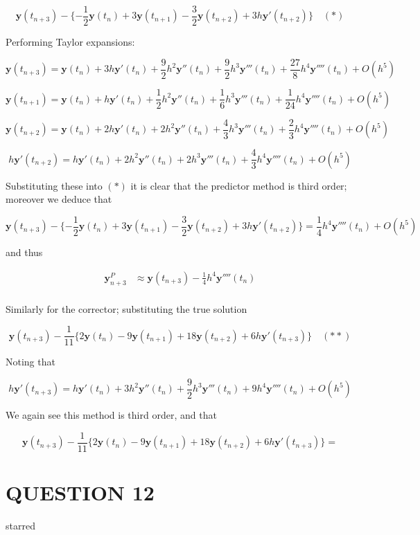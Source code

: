 \documentclass[a4paper]{article}
\begin{document}
\[ \mathbf{y}(t_{n+3}) - \{  - \frac{1}{2} \mathbf{y}(t_{n}) + 3 \mathbf{y}(t_{n+1})  - \frac{3}{2} \mathbf{y}(t_{n+2}) + 3h\mathbf{y}'(t_{n+2})  \} \quad (*) \]

Performing Taylor expansions:

\[ \mathbf{y}(t_{n+3}) = \mathbf{y}(t_{n}) + 3h \mathbf{y}'(t_{n}) + \frac{9}{2} h^{2} \mathbf{y}''(t_{n}) + \frac{9}{2} h^{3}  \mathbf{y}'''(t_{n}) + \frac{27}{8} h^{4} \mathbf{y}''''(t_{n})+ O(h^{5}) \]


\[ \mathbf{y}(t_{n+1}) = \mathbf{y}(t_{n}) + h \mathbf{y}'(t_{n}) + \frac{1}{2} h^{2} \mathbf{y}''(t_{n}) + \frac{1}{6} h^{3}  \mathbf{y}'''(t_{n}) + \frac{1}{24} h^{4} \mathbf{y}''''(t_{n})+ O(h^{5}) \]



\[ \mathbf{y}(t_{n+2}) = \mathbf{y}(t_{n}) + 2h \mathbf{y}'(t_{n}) + 2 h^{2} \mathbf{y}''(t_{n}) + \frac{4}{3} h^{3}  \mathbf{y}'''(t_{n}) + \frac{2}{3} h^{4} \mathbf{y}''''(t_{n})+ O(h^{5}) \]

\[ h\mathbf{y}'(t_{n+2}) = h \mathbf{y}'(t_{n}) + 2h^{2} \mathbf{y}''(t_{n}) + 2 h^{3} \mathbf{y}'''(t_{n}) + \frac{4}{3} h^{4}  \mathbf{y}''''(t_{n}) + O(h^{5}) \]

Substituting these into $ (*) $ it is clear that the predictor method is third order; moreover we deduce that 

\[ \mathbf{y}(t_{n+3}) - \{  - \frac{1}{2} \mathbf{y}(t_{n}) + 3 \mathbf{y}(t_{n+1})  - \frac{3}{2} \mathbf{y}(t_{n+2}) + 3h\mathbf{y}'(t_{n+2})  \} =  \frac{1}{4} h^{4} \mathbf{y}''''(t_{n}) + O(h^{5})   \]

and thus

\begin{align*}
\mathbf{y}_{n+3}^{P} & \approx \mathbf{y}(t_{n+3}) - \frac{1}{4} h^{4} \mathbf{y}''''(t_{n}) \\
\end{align*}

Similarly for the corrector; substituting the true solution

\[ \mathbf{y}(t_{n+3}) - \frac{1}{11} \{ 2 \mathbf{y}(t_{n}) - 9 \mathbf{y}(t_{n+1})  + 18 \mathbf{y}(t_{n+2}) + 6h\mathbf{y}'(t_{n+3})  \} \quad (**) \]

Noting that

\[ h\mathbf{y}'(t_{n+3}) = h \mathbf{y}'(t_{n}) + 3h^{2} \mathbf{y}''(t_{n}) + \frac{9}{2} h^{3} \mathbf{y}'''(t_{n}) + 9 h^{4}  \mathbf{y}''''(t_{n}) + O(h^{5}) \]

We again see this method is third order, and that 

\[ \mathbf{y}(t_{n+3}) - \frac{1}{11} \{ 2 \mathbf{y}(t_{n}) - 9 \mathbf{y}(t_{n+1})  + 18 \mathbf{y}(t_{n+2}) + 6h\mathbf{y}'(t_{n+3})  \} =  \]




\section{QUESTION 12}

starred
\end{document}
